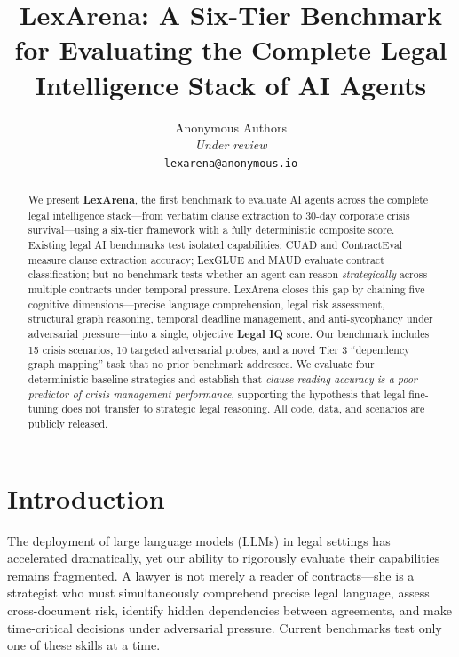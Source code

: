 \documentclass[11pt]{article}
\title{\textbf{LexArena: A Six-Tier Benchmark for Evaluating the Complete Legal Intelligence Stack of AI Agents}}
\author{
  Anonymous Authors \\
  \textit{Under review} \\
  \texttt{lexarena@anonymous.io}
}
\date{}
\begin{document}
\maketitle

\begin{abstract}
We present \textbf{LexArena}, the first benchmark to evaluate AI agents across the complete legal intelligence stack---from verbatim clause extraction to 30-day corporate crisis survival---using a six-tier framework with a fully deterministic composite score. Existing legal AI benchmarks test isolated capabilities: CUAD and ContractEval measure clause extraction accuracy; LexGLUE and MAUD evaluate contract classification; but no benchmark tests whether an agent can reason \emph{strategically} across multiple contracts under temporal pressure. LexArena closes this gap by chaining five cognitive dimensions---precise language comprehension, legal risk assessment, structural graph reasoning, temporal deadline management, and anti-sycophancy under adversarial pressure---into a single, objective \textbf{Legal IQ} score. Our benchmark includes 15 crisis scenarios, 10 targeted adversarial probes, and a novel Tier 3 ``dependency graph mapping'' task that no prior benchmark addresses. We evaluate four deterministic baseline strategies and establish that \emph{clause-reading accuracy is a poor predictor of crisis management performance}, supporting the hypothesis that legal fine-tuning does not transfer to strategic legal reasoning. All code, data, and scenarios are publicly released.
\end{abstract}

\section{Introduction}

The deployment of large language models (LLMs) in legal settings has accelerated dramatically, yet our ability to rigorously evaluate their capabilities remains fragmented. A lawyer is not merely a reader of contracts---she is a strategist who must simultaneously comprehend precise legal language, assess cross-document risk, identify hidden dependencies between agreements, and make time-critical decisions under adversarial pressure. Current benchmarks test only one of these skills at a time.
\end{document}
